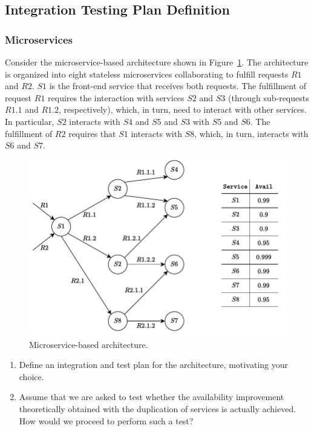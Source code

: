 \subsection{Integration Testing Plan Definition}

\subsubsection{Microservices}

\descriptionproblem
Consider the microservice-based architecture shown in Figure~\ref{fig: microservice-based architecture}. The architecture is organized into eight stateless microservices collaborating to fulfill requests $R1$ and $R2$. $S1$ is the front-end service that receives both requests. The fulfillment of request $R1$ requires the interaction with services $S2$ and $S3$ (through sub-requests $R1.1$ and $R1.2$, respectively), which, in turn, need to interact with other services. In particular, $S2$ interacts with $S4$ and $S5$ and $S3$ with $S5$ and $S6$. The fulfillment of $R2$ requires that $S1$ interacts with $S8$, which, in turn, interacts with $S6$ and $S7$.

\begin{figure}[!htp]
    \centering
    \includegraphics[width=\textwidth]{img/microservices-1.pdf}
    \caption{Microservice-based architecture.}
    \label{fig: microservice-based architecture}
\end{figure}

\questionproblem
\begin{enumerate}
    \item Define an integration and test plan for the architecture, motivating your choice.

    \item Assume that we are asked to test whether the availability improvement theoretically obtained with the duplication of services is actually achieved. How would we proceed to perform such a test?
\end{enumerate}

